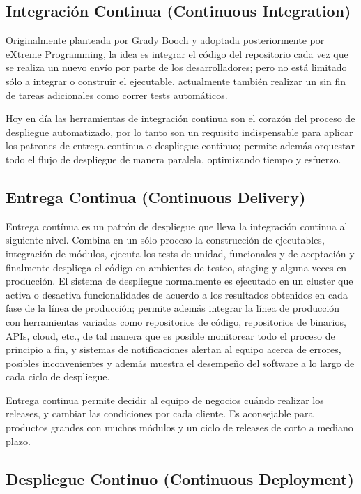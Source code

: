 \documentclass[conference]{IEEEtran}
\begin{document}
\subsection{Integración Continua (Continuous Integration)}

Originalmente planteada por Grady Booch y adoptada posteriormente por eXtreme Programming, la idea es integrar el código del repositorio cada vez que se realiza  un nuevo envío por parte de los desarrolladores; pero no está limitado sólo a integrar o construir el ejecutable, actualmente también realizar un sin fin de tareas adicionales como correr tests automáticos.

Hoy en día las herramientas de integración continua son el corazón del proceso de despliegue automatizado, por lo tanto son un requisito indispensable para aplicar los patrones de entrega continua o despliegue continuo; permite además orquestar todo el flujo de despliegue de manera paralela, optimizando tiempo y esfuerzo.

\subsection{Entrega Continua (Continuous Delivery)}

Entrega contínua es un patrón de despliegue que lleva la integración continua al siguiente nivel. Combina en un sólo proceso la construcción de ejecutables, integración de módulos, ejecuta los tests de unidad, funcionales y de aceptación y finalmente despliega el código en ambientes de testeo, staging y alguna veces en producción. El sistema de despliegue normalmente es ejecutado en un cluster que activa o desactiva funcionalidades de acuerdo  a los resultados obtenidos en cada fase de la línea de producción; permite además integrar la línea de producción con herramientas variadas como repositorios de código, repositorios de binarios, APIs, cloud, etc., de tal manera que es posible monitorear todo el proceso de principio a fin, y sistemas de notificaciones alertan al equipo acerca de errores, posibles inconvenientes y además muestra el desempeño del software a lo largo de cada ciclo de despliegue.

Entrega continua permite decidir al equipo de negocios cuándo realizar los releases, y cambiar las condiciones por cada cliente. Es aconsejable para productos grandes con muchos módulos y un ciclo de releases de corto a mediano plazo.

\subsection{Despliegue Continuo (Continuous Deployment)}
\end{document}
